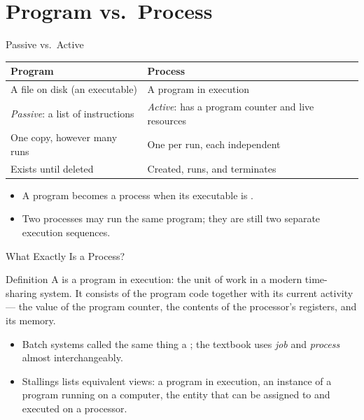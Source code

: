 \documentclass[aspectratio=169]{beamer}
\begin{document}

\section{Program vs.\ Process}

\begin{frame}{Passive vs.\ Active}
  \centering
  \renewcommand{\arraystretch}{1.35}
  \begin{tabular}{p{}p{}}
    \textbf{Program} & \textbf{Process} \\
    \hline
    A file on disk (an executable) & A program in execution \\
    \emph{Passive}: a list of instructions & \emph{Active}: has a program
    counter and live resources \\
    One copy, however many runs & One per run, each independent \\
    Exists until deleted & Created, runs, and terminates \\
  \end{tabular}
  \vspace{0.35cm}
  \begin{itemize}
    \item A program becomes a process when its executable is .
    \item Two processes may run the same program; they are still two separate
      execution sequences.
  \end{itemize}
\end{frame}

\begin{frame}{What Exactly Is a Process?}
  \begin{block}{Definition}
    A  is a program in execution: the unit of work in a modern
    time-sharing system. It consists of the program code together with its
    current activity --- the value of the program counter, the contents of the
    processor's registers, and its memory.
  \end{block}
  \begin{itemize}
    \item Batch systems called the same thing a ; the textbook uses
      \emph{job} and \emph{process} almost interchangeably.
    \item Stallings lists equivalent views: a program in execution, an
      instance of a program running on a computer, the entity that can be
      assigned to and executed on a processor.
  \end{itemize}
\end{frame}
\end{document}
